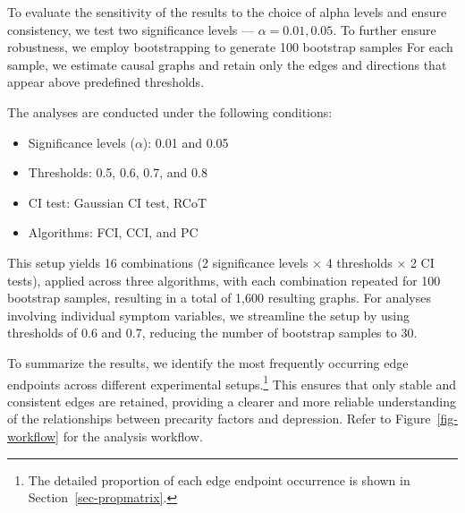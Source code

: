 \documentclass[
]{article}
\providecommand{\tightlist}{%
  \setlength{\itemsep}{0pt}\setlength{\parskip}{0pt}}\usepackage{longtable,booktabs,array}
\begin{document}
To evaluate the sensitivity of the results to the choice of alpha levels
and ensure consistency, we test two significance levels ---
\(\alpha = 0.01, 0.05\). To further ensure robustness, we employ
bootstrapping to generate 100 bootstrap samples For each sample, we
estimate causal graphs and retain only the edges and directions that
appear above predefined thresholds.

The analyses are conducted under the following conditions:

\begin{itemize}
\tightlist
\item
  Significance levels (\(\alpha\)): 0.01 and 0.05
\item
  Thresholds: 0.5, 0.6, 0.7, and 0.8
\item
  CI test: Gaussian CI test, RCoT
\item
  Algorithms: FCI, CCI, and PC
\end{itemize}

This setup yields 16 combinations (2 significance levels × 4 thresholds
× 2 CI tests), applied across three algorithms, with each combination
repeated for 100 bootstrap samples, resulting in a total of 1,600
resulting graphs. For analyses involving individual symptom variables,
we streamline the setup by using thresholds of 0.6 and 0.7, reducing the
number of bootstrap samples to 30.

To summarize the results, we identify the most frequently occurring edge
endpoints across different experimental setups.\footnote{The detailed
  proportion of each edge endpoint occurrence is shown in
  Section~\ref{sec-propmatrix}.} This ensures that only stable and
consistent edges are retained, providing a clearer and more reliable
understanding of the relationships between precarity factors and
depression. Refer to Figure~\ref{fig-workflow} for the analysis
workflow.
\end{document}
